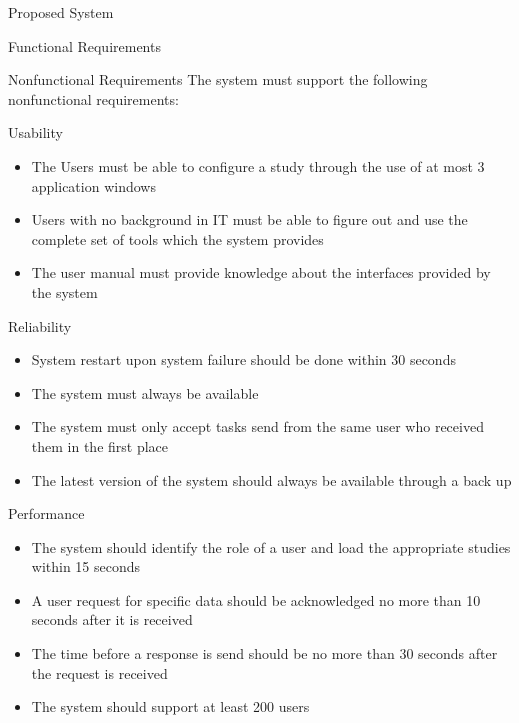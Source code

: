 \documentclass{article}
\begin{document}
\begin{section}{Proposed System}
\begin{subsection}{Functional Requirements}
\begin{itemize}
\end{itemize}

\end{subsection}

\begin{subsection}{Nonfunctional Requirements}
The system must support the following nonfunctional requirements:

\begin{subsubsection}{Usability}
\begin{itemize}
\item The Users must be able to configure a study through the use of at most 3 application windows
\item Users with no background in IT must be able to figure out and use the complete set of tools which the system provides
\item The user manual must provide knowledge about the interfaces provided by the system
\end{itemize}
\end{subsubsection}

\begin{subsubsection}{Reliability}
\begin{itemize}
\item System restart upon system failure should be done within 30 seconds
\item The system must always be available
\item The system must only accept tasks send from the same user who received them in the first place
\item The latest version of the system should always be available through a back up
\end{itemize}
\end{subsubsection}

\begin{subsubsection}{Performance}
\begin{itemize}
\item The system should identify the role of a user and load the appropriate studies within 15 seconds
\item A user request for specific data should be acknowledged no more than 10 seconds after it is received
\item The time before a response is send should be no more than 30 seconds after the request is received
\item The system should support at least 200 users
\end{itemize}
\end{subsubsection}


\end{subsection}
\end{section}
\end{document}
